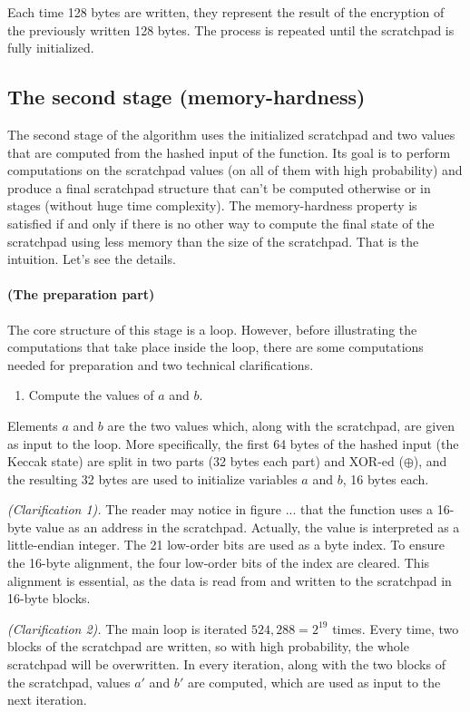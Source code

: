 Each time 128 bytes are written, they represent the result of the encryption of the previously written 128 bytes. The process is repeated until the scratchpad is fully initialized.

\subsection{The second stage (memory-hardness)} \label{sec:second}
The second stage of the algorithm uses the initialized scratchpad and two values that are computed from the hashed input of the function. Its goal is to perform computations on the scratchpad values (on all of them with high probability) and produce a final scratchpad structure that can't be computed otherwise or in stages (without huge time complexity). The memory-hardness property is satisfied if and only if there is no other way to compute the final state of the scratchpad using less memory than the size of the scratchpad. That is the intuition. Let's see the details.

\paragraph{(The preparation part)} The core structure of this stage is a loop. However, before illustrating the computations that take place inside the loop, there are some computations needed for preparation and two technical clarifications.

\begin{enumerate}
  \item \label{memh: step 1} Compute the values of $a$ and $b$.
\end{enumerate}
Elements $a$ and $b$ are the two values which, along with the scratchpad, are given as input to the loop. More specifically, the first 64 bytes of the hashed input (the Keccak state) are split in two parts (32 bytes each part) and XOR-ed ($\oplus$), and the resulting 32 bytes are used to initialize variables $a$ and $b$, 16 bytes each.

\noindent \emph{(Clarification 1).} The reader may notice in figure ... that the function uses a 16-byte value as an address in the scratchpad. Actually, the value is interpreted as a little-endian integer. The 21 low-order bits are used as a byte index. To ensure the 16-byte alignment, the four low-order bits of the index are cleared. This alignment is essential, as the data is read from and written to the scratchpad in 16-byte blocks.

\noindent \emph{(Clarification 2).} The main loop is iterated $524,288 = 2^{19}$ times. Every time, two blocks of the scratchpad are written, so with high probability, the whole scratchpad will be overwritten. In every iteration, along with the two blocks of the scratchpad, values $a'$ and $b'$ are computed, which are used as input to the next iteration.


